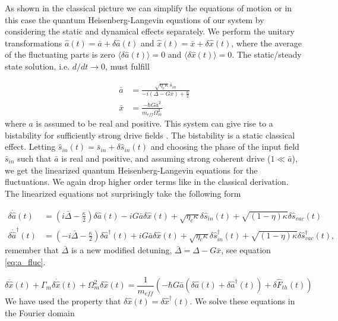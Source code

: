 As shown in the classical picture we can simplify the equations of motion or in this case the quantum Heisenberg-Langevin equations of our system by considering the static and dynamical effects separately. We perform the unitary transformations $\hat{a}(t) = \bar{a} + \delta\hat{a}(t)$ and $\hat{x}(t) = \bar{x} + \delta\hat{x}(t)$, where the average of the fluctuating parts is zero $\langle \delta\hat{a}(t) \rangle = 0$ and $\langle \delta\hat{x}(t) \rangle = 0$. The static/steady state solution, i.e. $d/dt \rightarrow 0$, must fulfill

\begin{align}
\bar{a} & = \frac{\sqrt{\eta_c\kappa}\bar{s}_{in}}{-i(\Delta - G\bar{x}) + \frac{\kappa}{2}} \label{eq:ss_a} \\
\bar{x} & = \frac{-\hbar G \bar{a}^2}{m_{eff}\Omega_m^2}
\label{eq:ss_x}
\end{align}
\noindent
where $a$ is assumed to be real and positive. This system can give rise to a bistability for sufficiently strong drive fields \cite{weis2010, schliesser2009}. The bistability is a static classical effect. Letting $\hat{s}_{in}(t) = \bar{s}_{in} + \delta\hat{s}_{in}(t)$ and choosing the phase of the input field $\bar{s}_{in}$ such that $\bar{a}$ is real and positive, and assuming strong coherent drive ($1 \ll \bar{a}$), we get the linearized quantum Heisenberg-Langevin equations for the fluctuations. We again drop higher order terms like in the classical derivation. The linearized equations not surprisingly take the following form

\begin{align}
\delta\dot{\hat{a}}(t) & = \left( i\bar{\Delta} - \frac{\kappa}{2} \right)\delta\hat{a}(t) - iG\bar{a}\delta\hat{x}(t) + \sqrt{\eta_c\kappa}\delta\hat{s}_{in}(t) + \sqrt{(1 - \eta)\kappa}\delta\hat{s}_{vac}(t) \\
\delta\dot{\hat{a}}^\dagger(t) & = \left( -i\bar{\Delta} - \frac{\kappa}{2} \right)\delta\hat{a}^\dagger(t) + iG\bar{a}\delta\hat{x}(t) + \sqrt{\eta_c\kappa}\delta\hat{s}^\dagger_{in}(t) + \sqrt{(1 - \eta)\kappa}\delta\hat{s}^\dagger_{vac}(t),
\end{align}
\noindent
remember that $\bar{\Delta}$ is a new modified detuning, $\bar{\Delta} = \Delta -G\bar{x}$, see equation \eqref{eq:a_fluc}.

\begin{equation}
\delta\ddot{\hat{x}}(t) + \Gamma_m\delta\dot{\hat{x}}(t) + \Omega_m^2\delta\hat{x}(t) = \frac{1}{m_{eff}}\left( -\hbar G\bar{a}(\delta\hat{a}(t) + \delta\hat{a}^\dagger(t)) + \delta\hat{F}_{th}(t) \right)
\end{equation}
\noindent
We have used the property that $\delta\hat{x}(t) = \delta\hat{x}^\dagger(t)$. We solve these equations in the Fourier domain

